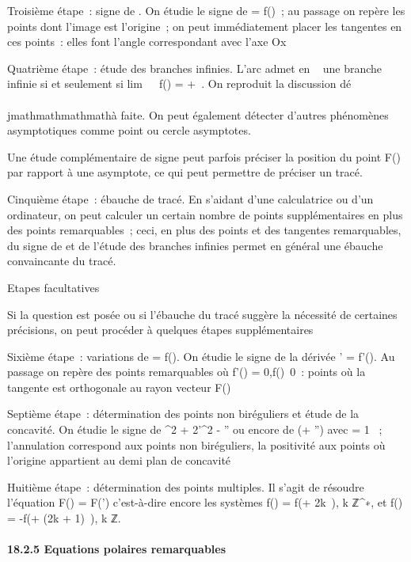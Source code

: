 Troisième étape~: signe de \rho. On étudie le signe de \rho = f(\theta)~; au
passage on repère les points dont l'image est l'origine~; on peut
immédiatement placer les tangentes en ces points~: elles font l'angle
correspondant avec l'axe Ox

Quatrième étape~: étude des branches infinies. L'arc admet en \alpha~
\in\overlineD une branche infinie si et seulement si
lim\theta\rightarrow~\alpha~~\textbar{}f(\theta)\textbar{} = +\infty~.
On reproduit la discussion dé\\\\jmathmathmathmathà faite. On peut également détecter
d'autres phénomènes asymptotiques comme point ou cercle asymptotes.

Une étude complémentaire de signe peut parfois préciser la position du
point F(\theta) par rapport à une asymptote, ce qui peut permettre de
préciser un tracé.

Cinquième étape~: ébauche de tracé. En s'aidant d'une calculatrice ou
d'un ordinateur, on peut calculer un certain nombre de points
supplémentaires en plus des points remarquables~; ceci, en plus des
points et des tangentes remarquables, du signe de \rho et de l'étude des
branches infinies permet en général une ébauche convaincante du tracé.

Etapes facultatives

Si la question est posée ou si l'ébauche du tracé suggère la nécessité
de certaines précisions, on peut procéder à quelques étapes
supplémentaires

Sixième étape~: variations de \rho = f(\theta). On étudie le signe de la dérivée
\rho' = f'(\theta). Au passage on repère des points remarquables où
f'() = 0,f()\neq~0~:
points où la tangente est orthogonale au rayon vecteur F()

Septième étape~: détermination des points non biréguliers et étude de la
concavité. On étudie le signe de \rho^2 + 2\rho'^2 -
\rho\rho'' ou encore de \phi(\phi + \phi'') avec \phi = 1 \over \rho ~;
l'annulation correspond aux points non biréguliers, la positivité aux
points où l'origine appartient au demi plan de concavité

Huitième étape~: détermination des points multiples. Il s'agit de
résoudre l'équation F(\theta) = F(\theta') c'est-à-dire encore les systèmes f(\theta) =
f(\theta + 2k\pi~), k \in ℤ^∗, et f(\theta) = -f(\theta + (2k + 1)\pi~), k \in ℤ.

\paragraph{18.2.5 Equations polaires remarquables}

